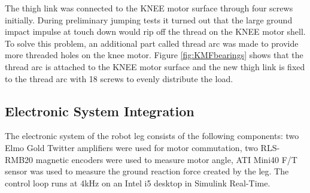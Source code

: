 The thigh link was connected to the KNEE motor surface through four screws initially. During preliminary jumping tests it turned out that the large ground impact impulse at touch down would rip off the thread on the KNEE motor shell. To solve this problem, an additional part called thread arc was made to provide more threaded holes on the knee motor. Figure \ref{fig:KMFbearings} shows that the thread arc is attached to the KNEE motor surface and the new thigh link is fixed to the thread arc with 18 screws to evenly distribute the load.

\subsection{\textbf{Electronic System Integration}}
\label{sec:Electronics}

The electronic system of the robot leg consists of the following components: two Elmo Gold Twitter amplifiers were used for motor commutation, two RLS-RMB20 magnetic encoders were used to measure motor angle, ATI Mini40 F/T sensor was used to measure the ground reaction force created by the leg. The control loop runs at 4kHz on an Intel i5 desktop in Simulink Real-Time. 


